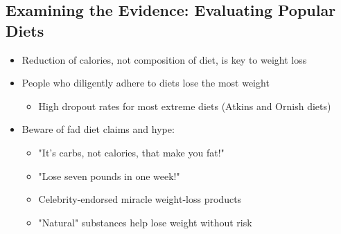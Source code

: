 \documentclass[12pt]{article}
\begin{document}
        \subsection{Examining the Evidence: Evaluating Popular Diets}
            \begin{itemize}
                \item Reduction of calories, not composition of diet, is key to weight loss
                \item People who diligently adhere to diets lose the most weight
                    \begin{itemize}
                        \item High dropout rates for most extreme diets (Atkins and Ornish diets)
                    \end{itemize}
                \item Beware of fad diet claims and hype:
                    \begin{itemize}
                        \item "It's carbs, not calories, that make you fat!"
                        \item "Lose seven pounds in one week!"
                        \item Celebrity-endorsed miracle weight-loss products
                        \item "Natural" substances help lose weight without risk
                    \end{itemize}
            \end{itemize}
\end{document}
